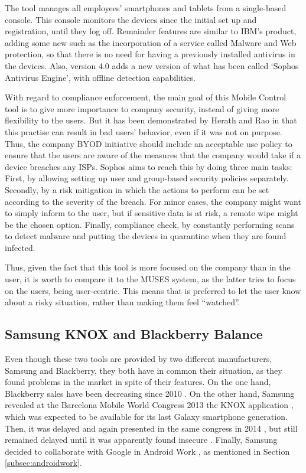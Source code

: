 The tool manages all employees' smartphones and tablets from a single-based console. This console monitors the devices since the initial set up and registration, until they log off. Remainder features are similar to IBM's product, adding some new such as the incorporation of a service called Malware and Web protection, so that there is no need for having a previously installed antivirus in the devices. Also, version 4.0 adds a new version of what has been called `Sophos Antivirus Engine', with offline detection capabilities.

With regard to compliance enforcement, the main goal of this Mobile Control tool is to give more importance to company security, instead of giving more flexibility to the users. But it has been demonstrated by Herath and Rao in \cite{SecPolPenalty09} that this practise can result in bad users' behavior, even if it was not on purpose. Thus, the company BYOD initiative should include an acceptable use policy to ensure that the users are aware of the measures that the company would take if a device breaches any ISPs. Sophos aims to reach this by doing three main tasks: First, by allowing setting up user and group-based security policies separately. Secondly, by a risk mitigation in which the actions to perform can be set according to the severity of the breach. For minor cases, the company might want to simply inform to the user, but if sensitive data is at risk, a remote wipe might be the chosen option. Finally, compliance check, by constantly performing scans to detect malware and putting the devices in quarantine when they are found infected.

Thus, given the fact that this tool is more focused on the company
than in the user, it is worth to compare it to the MUSES system, as
the latter tries to focus on the users, being user-centric. This means
that is preferred to let the user know about a risky situation, rather
than making them feel ``watched''. 


\subsection{Samsung KNOX and Blackberry Balance}
\label{subsec:samsungblackberry}

Even though these two tools are provided by two different manufacturers, Samsung and Blackberry, they both have in common their situation, as they found problems in the market in spite of their features. On the one hand, Blackberry sales have been decreasing since 2010 \cite{Blackberry_sales}.
On the other hand, Samsung revealed at the Barcelona Mobile World Congress 2013 the KNOX application \cite{Samsung_mwc13}, which was expected to be available for its last Galaxy smartphone generation. Then, it was delayed and again presented in the same congress in 2014 \cite{Samsung_mwc14}, but still remained delayed until it was apparently found insecure \cite{Samsung_insecure}. Finally, Samsung decided to collaborate with Google in Android Work \cite{Samsung_android}, as mentioned in Section \ref{subsec:androidwork}.

